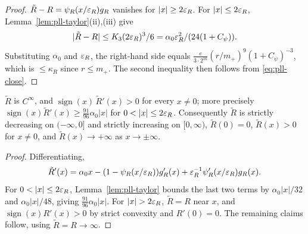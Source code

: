 \begin{proof}
$\tilde R-R=\psi_R(x/\varepsilon_R)g_R$ vanishes for $|x|\ge2\varepsilon_R$. For $|x|\le2\varepsilon_R$, Lemma~\ref{lem:pll-taylor}(ii),(iii) give
\[
|\tilde R-R|\le K_3(2\varepsilon_R)^3/6=\alpha_0\varepsilon_R^2/(24(1+C_\psi)).
\]
Substituting $\alpha_0$ and $\varepsilon_R$, the right-hand side equals $\frac{e}{3\cdot2^{16}}(r/m_+)^9(1+C_\psi)^{-3}$, which is $\le\kappa_R$ since $r\le m_+$. The second inequality then follows from \eqref{eq:pll-close}.
\end{proof}

\begin{lemma}[Monotonicity]\label{lem:pll-Rtilde-mono}
$\tilde R$ is $C^\infty$, and $\operatorname{sign}(x)\,\tilde R'(x)>0$ for every $x\ne0$; more precisely
$\operatorname{sign}(x)\tilde R'(x)\ge\frac{91}{96}\alpha_0|x|$ for $0<|x|\le2\eps_R$. Consequently $\tilde R$ is
strictly decreasing on $(-\infty,0]$ and strictly increasing on $[0,\infty)$, $\tilde R(0)=0$, $\tilde R(x)>0$
for $x\ne0$, and $\tilde R(x)\to+\infty$ as $x\to\pm\infty$.
\end{lemma}

\begin{proof}
Differentiating,
\[
\tilde R'(x)=\alpha_0x-(1-\psi_R(x/\varepsilon_R))g_R'(x)+\varepsilon_R^{-1}\psi_R'(x/\varepsilon_R)g_R(x).
\]
For $0<|x|\le2\eps_R$, Lemma~\ref{lem:pll-taylor} bounds the last two terms by $\alpha_0|x|/32$ and $\alpha_0|x|/48$, giving $\frac{91}{96}\alpha_0|x|$. For $|x|>2\eps_R$, $\tilde R=R$ near $x$, and $\operatorname{sign}(x)R'(x)>0$ by strict convexity and $R'(0)=0$. The remaining claims follow, using $\tilde R=R\to\infty$.
\end{proof}

